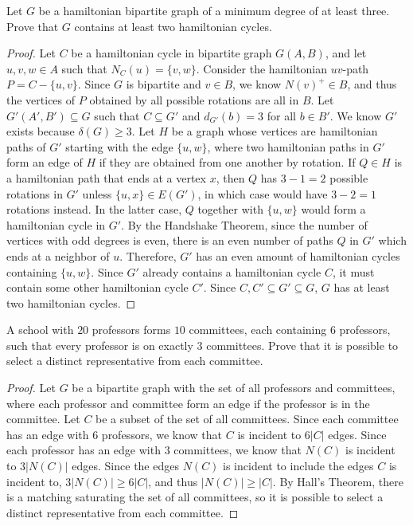 \documentclass{article}
\newenvironment{problem}[2][Problem]{\begin{trivlist}
\item[\hskip \labelsep {\bfseries #1}\hskip \labelsep {\bfseries #2.}]}{\end{trivlist}}
\begin{document}
\begin{problem}{2.5.11}
    Let $G$ be a hamiltonian bipartite graph of a minimum degree of at least three. Prove that $G$ contains at least two hamiltonian cycles.
\end{problem}
\begin{proof}
    Let $C$ be a hamiltonian cycle in bipartite graph $G(A,B)$, and let $u, v, w \in A$ such that $N_C(u) = \{v, w\}$. Consider the hamiltonian $uv$-path $P = C - \{u, v\}$. Since $G$ is bipartite and $v \in B$, we know $N(v)^+ \in B$, and thus the vertices of $P$ obtained by all possible rotations are all in $B$. Let $G'(A', B') \subseteq G$ such that $C \subseteq G'$ and $d_{G'}(b) = 3$ for all $b \in B'$. We know $G'$ exists because $\delta(G) \geq 3$. Let $H$ be a graph whose vertices are hamiltonian paths of $G'$ starting with the edge $\{u, w\}$, where two hamiltonian paths in $G'$ form an edge of $H$ if they are obtained from one another by rotation. If $Q \in H$ is a hamiltonian path that ends at a vertex $x$, then $Q$ has $3 - 1 = 2$ possible rotations in $G'$ unless $\{u, x\} \in E(G')$, in which case would have $3 - 2 = 1$ rotations instead. In the latter case, $Q$ together with $\{u, w\}$ would form a hamiltonian cycle in $G'$. By the Handshake Theorem, since the number of vertices with odd degrees is even, there is an even number of paths $Q$ in $G'$ which ends at a neighbor of $u$. Therefore, $G'$ has an even amount of hamiltonian cycles containing $\{u, w\}$. Since $G'$ already contains a hamiltonian cycle $C$, it must contain some other hamiltonian cycle $C'$. Since $C, C' \subseteq G' \subseteq G$, $G$ has at least two hamiltonian cycles.
\end{proof}

\begin{problem}{3.8.1}
    A school with $20$ professors forms $10$ committees, each containing $6$ professors, such that every professor is on exactly $3$ committees. Prove that it is possible to select a distinct representative from each committee.
\end{problem}

\begin{proof}
    Let $G$ be a bipartite graph with the set of all professors and committees, where each professor and committee form an edge if the professor is in the committee. Let $C$ be a subset of the set of all committees. Since each committee has an edge with $6$ professors, we know that $C$ is incident to $6|C|$ edges. Since each professor has an edge with $3$ committees, we know that $N(C)$ is incident to $3|N(C)|$ edges. Since the edges $N(C)$ is incident to include the edges $C$ is incident to, $3|N(C)| \geq 6|C|$, and thus $|N(C)| \geq |C|$. By Hall's Theorem, there is a matching saturating the set of all committees, so it is possible to select a distinct representative from each committee.
\end{proof}
\end{document}
